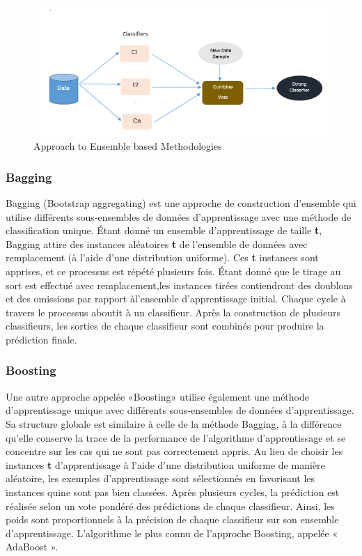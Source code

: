 \documentclass[12pt, french]{report}
\begin{document}
\begin{figure}[h]
	\includegraphics{images/ensemble.png}
	\caption{Approach to Ensemble based Methodologies }
	\label{ensemble}
\end{figure}

\subsubsection{Bagging}
Bagging (Bootstrap aggregating) est une approche de construction d'ensemble qui 
utilise différents sous-ensembles de données d’apprentissage avec une  méthode  de classification unique.  Étant  donné  un  ensemble  d’apprentissage  de  taille \textbf{t}, Bagging attire des instances aléatoires \textbf{t} de l'ensemble de données avec remplacement (à l'aide d'une distribution uniforme). Ces \textbf{t} instances sont apprises, et ce processus est répété plusieurs fois. Étant donné que le tirage au sort est effectué avec remplacement,les   instances   tirées   contiendront des   doublons   et   des   omissions   par   rapport   àl'ensemble  d'apprentissage initial.  Chaque  cycle  à  travers  le  processus  aboutit  à  un classifieur.  Après  la  construction  de  plusieurs  classifieurs,  les  sorties  de  chaque classifieur sont combinés pour produire la prédiction finale. 
\subsubsection{Boosting}
Une  autre  approche  appelée  «Boosting»  utilise  également une  méthode d'apprentissage  unique  avec  différents  sous-ensembles  de  données  d’apprentissage. Sa structure globale est similaire à celle de la méthode Bagging, à la différence qu’elle  conserve  la  trace  de  la  performance  de  l'algorithme  d'apprentissage  et  se concentre  sur  les  cas  qui  ne  sont  pas  correctement  appris.  Au  lieu  de  choisir  les instances \textbf{t} d’apprentissage à l'aide d'une distribution uniforme de manière aléatoire, les exemples d’apprentissage sont sélectionnés en favorisant les instances quine sont pas  bien  classées.  Après  plusieurs  cycles,  la  prédiction  est  réalisée  selon  un  vote pondéré des prédictions de chaque classifieur. Ainsi, les poids sont proportionnels à la précision de chaque classifieur sur son ensemble d'apprentissage. L’algorithme le plus connu de l’approche Boosting, appelée « AdaBoost ».
\end{document}
